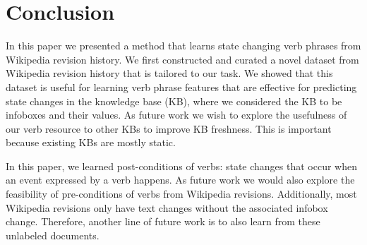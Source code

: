 \section{Conclusion}
In this paper we presented a method that learns state changing verb phrases from Wikipedia revision history.
We first constructed and curated a novel dataset from Wikipedia revision history that is tailored to our task.  We showed that this dataset is useful for learning verb phrase features that are effective for predicting state changes in the knowledge base (KB), where we considered the KB to be infoboxes and their values. As future work we wish to explore the usefulness of  our verb resource to other KBs to improve KB freshness. This is important because existing KBs are mostly static.

 In this paper, we learned   post-conditions of verbs: state changes that  occur  when an event expressed by a verb happens. As  future work we would also   explore the feasibility of   pre-conditions of verbs from  Wikipedia revisions. Additionally, most Wikipedia revisions only have text changes without the associated infobox change. Therefore,  another line of future work is to also learn from these unlabeled documents.


